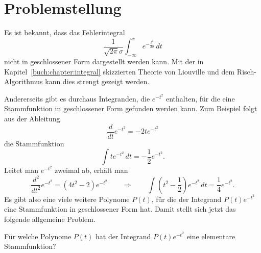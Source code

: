 %
%
%
\section{Problemstellung\label{dreieck:section:problemstellung}}
Es ist bekannt, dass das Fehlerintegral
\[
\frac{1}{\sqrt{2\pi}\sigma} \int_{-\infty}^x e^{-\frac{t^2}{2\sigma}}\,dt
\]
nicht in geschlossener Form dargestellt werden kann.
Mit der in Kapitel~\ref{buch:chapter:integral} skizzierten Theorie von
Liouville und dem Risch-Algorithmus kann dies strengt gezeigt werden.

Andererseits gibt es durchaus Integranden, die $e^{-t^2}$ enthalten,
für die eine Stammfunktion in geschlossener Form gefunden werden kann.
Zum Beispiel folgt aus der Ableitung
\[
\frac{d}{dt} e^{-t^2}
=
-2te^{-t^2}
\]
die Stammfunktion
\[
\int te^{-t^2}\,dt
=
-\frac12 e^{-t^2}.
\]
Leitet man $e^{-t^2}$ zweimal ab, erhält man
\[
\frac{d^2}{dt^2} e^{-t^2}
=
(4t^2-2) e^{-t^2}
\qquad\Rightarrow\qquad
\int (t^2-{\textstyle\frac12}) e^{-t^2}\,dt
=
{\textstyle\frac14}
e^{-t^2}.
\]
Es gibt also eine viele weitere Polynome $P(t)$, für die der Integrand
$P(t)e^{-t^2}$ eine Stammfunktion in geschlossener Form hat.
Damit stellt sich jetzt das folgende allgemeine Problem.

\begin{problem}
\label{dreieck:problem}
Für welche Polynome $P(t)$ hat der Integrand $P(t)e^{-t^2}$
eine elementare Stammfunktion?
\end{problem}


